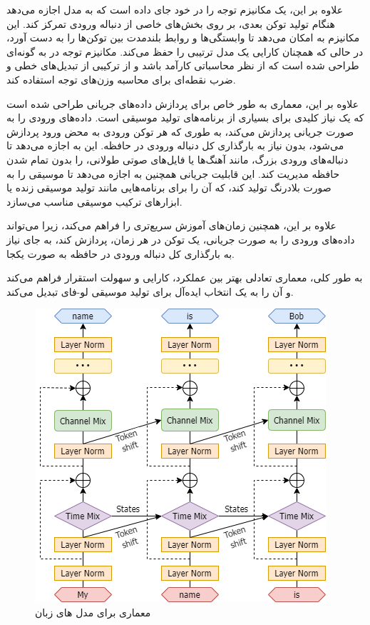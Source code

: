 علاوه بر این،  یک مکانیزم توجه  را در خود جای داده است که به مدل اجازه می‌دهد هنگام تولید توکن بعدی، بر روی بخش‌های خاصی از دنباله ورودی تمرکز کند. این مکانیزم به  امکان می‌دهد تا وابستگی‌ها و روابط بلندمدت بین توکن‌ها را به دست آورد، در حالی که همچنان کارایی یک مدل ترتیبی را حفظ می‌کند. مکانیزم توجه در  به گونه‌ای طراحی شده است که از نظر محاسباتی کارآمد باشد و از ترکیبی از تبدیل‌های خطی و ضرب نقطه‌ای برای محاسبه وزن‌های توجه استفاده کند.

علاوه بر این، معماری  به طور خاص برای پردازش داده‌های جریانی طراحی شده است که یک نیاز کلیدی برای بسیاری از برنامه‌های تولید موسیقی است.  داده‌های ورودی را به صورت جریانی پردازش می‌کند، به طوری که هر توکن ورودی به محض ورود پردازش می‌شود، بدون نیاز به بارگذاری کل دنباله ورودی در حافظه. این به  اجازه می‌دهد تا دنباله‌های ورودی بزرگ، مانند آهنگ‌ها یا فایل‌های صوتی طولانی، را بدون تمام شدن حافظه مدیریت کند. این قابلیت جریانی همچنین به  اجازه می‌دهد تا موسیقی را به صورت بلادرنگ تولید کند، که آن را برای برنامه‌هایی مانند تولید موسیقی زنده یا ابزارهای ترکیب موسیقی مناسب می‌سازد.

علاوه بر این،  همچنین زمان‌های آموزش سریع‌تری را فراهم می‌کند، زیرا می‌تواند داده‌های ورودی را به صورت جریانی، یک توکن در هر زمان، پردازش کند، به جای نیاز به بارگذاری کل دنباله ورودی در حافظه به صورت یکجا.

به طور کلی، معماری  تعادلی بهتر بین عملکرد، کارایی و سهولت استقرار فراهم می‌کند و آن را به یک انتخاب ایده‌آل برای تولید موسیقی لو-فای تبدیل می‌کند.
\begin{figure}[!htb]
      \centering
      \includegraphics[scale=0.5]{Figures/RWKV-arch.png}
      \caption{معماری  برای مدل های زبان
      }
      \label{Fig:RWKV}
\end{figure}


